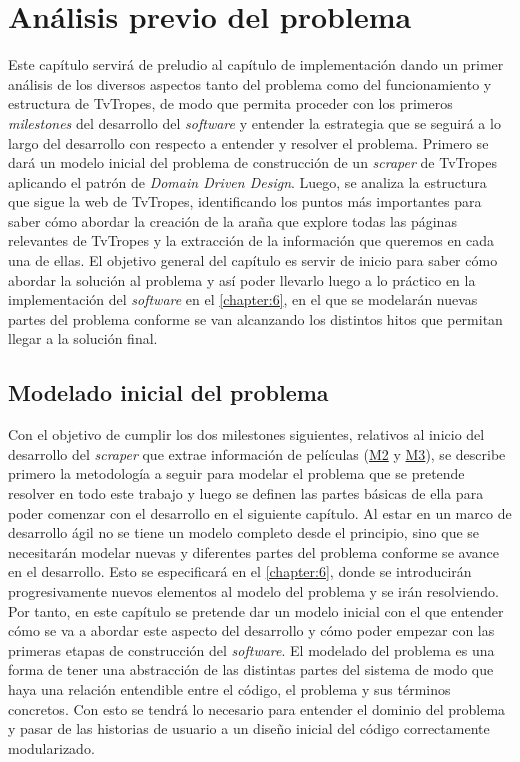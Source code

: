 \chapter{Análisis previo del problema}
\label{chapter:5}

Este capítulo servirá de preludio al capítulo de implementación dando un primer
análisis de los diversos aspectos tanto del problema como del funcionamiento y
estructura de TvTropes, de modo que permita proceder con los primeros
\textit{milestones} del desarrollo del \textit{software} y entender la
estrategia que se seguirá a lo largo del desarrollo con respecto a entender y
resolver el problema. Primero se dará un modelo inicial del problema de
construcción de un \textit{scraper} de TvTropes aplicando el patrón de
\textit{Domain Driven Design}. Luego, se analiza la estructura que sigue la web
de TvTropes, identificando los puntos más importantes para saber cómo abordar la
creación de la araña que explore todas las páginas relevantes de TvTropes y la
extracción de la información que queremos en cada una de ellas. El objetivo
general del capítulo es servir de inicio para saber cómo abordar la solución al
problema y así poder llevarlo luego a lo práctico en la implementación del
\textit{software} en el \autoref{chapter:6}, en el que se modelarán nuevas
partes del problema conforme se van alcanzando los distintos hitos que permitan
llegar a la solución final.

\section{Modelado inicial del problema}
Con el objetivo de cumplir los dos milestones siguientes, relativos al inicio
del desarrollo del \textit{scraper} que extrae información de películas
(\href{https://github.com/jlgallego99/TropesToGo/milestone/3}{M2} y
\href{https://github.com/jlgallego99/TropesToGo/milestone/7}{M3}), se describe
primero la metodología a seguir para modelar el problema que se pretende
resolver en todo este trabajo y luego se definen las partes básicas de ella para
poder comenzar con el desarrollo en el siguiente capítulo. Al estar en un marco
de desarrollo ágil no se tiene un modelo completo desde el principio, sino que
se necesitarán modelar nuevas y diferentes partes del problema conforme se
avance en el desarrollo. Esto se especificará en el \ref{chapter:6}, donde se
introducirán progresivamente nuevos elementos al modelo del problema y se irán
resolviendo. Por tanto, en este capítulo se pretende dar un modelo inicial con
el que entender cómo se va a abordar este aspecto del desarrollo y cómo poder
empezar con las primeras etapas de construcción del \textit{software}. El
modelado del problema es una forma de tener una abstracción de las distintas
partes del sistema de modo que haya una relación entendible entre el código, el
problema y sus términos concretos. Con esto se tendrá lo necesario para entender
el dominio del problema y pasar de las historias de usuario a un diseño inicial
del código correctamente modularizado.

